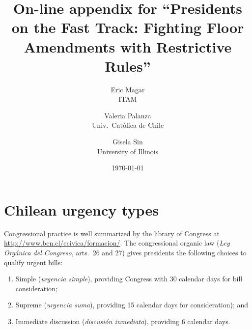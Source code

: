 \documentclass[letter,12pt]{article}
\begin{document}
\title{On-line appendix for ``Presidents on the Fast Track: Fighting Floor Amendments with Restrictive Rules''}
\author{Eric Magar \\ ITAM \and
        Valeria Palanza \\ Univ.\ Católica de Chile \and  
        Gisela Sin \\ University of Illinois
}
\date{\today}
\maketitle


\tableofcontents

\doublespacing

\renewcommand\thefigure{A.\arabic{figure}} 
\renewcommand\thetable{A.\arabic{table}} 



\section{Chilean urgency types}

Congressional practice is well summarized by the library of Congress at \url{http://www.bcn.cl/ecivica/formacion/}. The congressional organic law (\emph{Ley Orgánica del Congreso}, arts.\ 26 and 27) gives presidents the following choices to qualify urgent bills:

\begin{enumerate}
\item Simple (\emph{urgencia simple}), providing Congress with 30 calendar days for bill consideration;
\item Supreme (\emph{urgencia suma}), providing 15 calendar days for consideration); and
\item Immediate discussion (\emph{discusión inmediata}), providing 6 calendar days.
\end{enumerate}
\end{document}
